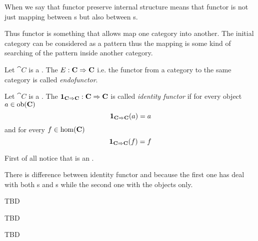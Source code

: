 \begin{remark}[Functor]
When we say that functor preserve internal structure means that
functor is not just mapping between s but also
between s.  
\end{remark}

Thus functor is something that allows map one category into another.
The initial category can be considered as a pattern thus the mapping
is some kind of searching of the pattern inside another category.

\begin{definition}[Endofunctor]
\label{def:endofunctor}
Let $\cat{C}$ is a . The
 $E: \mathbf{C} \Rightarrow \mathbf{C}$ i.e. 
the functor from a category to the same category is called
\textit{endofunctor}. 
\end{definition}

\begin{definition}
\label{def:idfunctor}
Let $\cat{C}$ is a . The
 $\mathbf{1}_{ \mathbf{C} \Rightarrow \mathbf{C} }: \mathbf{C} \Rightarrow \mathbf{C}$ is called \textit{identity
functor} if for every object $a \in \mathrm{ob}(\mathbf{C})$
\[
\mathbf{1}_{ \mathbf{C} \Rightarrow \mathbf{C} }(a) = a
\]
and for every  $f \in \mathrm{hom}(\mathbf{C})$
\[
\mathbf{1}_{ \mathbf{C} \Rightarrow \mathbf{C} }(f) = f
\] 
\end{definition}

\begin{remark}
  \label{rem:idfunctor}
  First of all notice that  is an
  .

  There is difference between identity functor and 
  because the first one has deal with both s and
  s while the second one with the objects
  only. 
\end{remark}

\begin{definition}
TBD
\end{definition}

\begin{definition}
TBD
\end{definition}

\begin{definition}
TBD
\end{definition}

